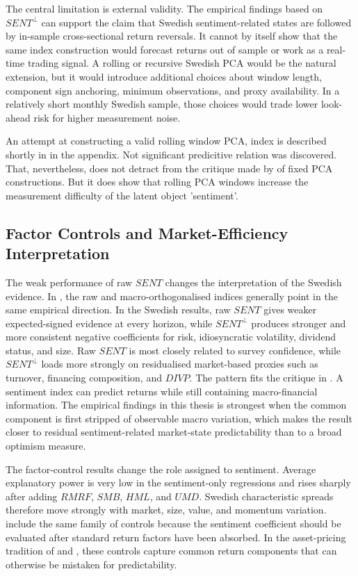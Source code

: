 \documentclass[11pt]{article}
\newcommand{\var}[1]{\ensuremath{#1}}
\begin{document}
The central limitation is external validity. The empirical findings based on \var{SENT^{\perp}} can support the claim that Swedish sentiment-related states are followed by in-sample cross-sectional return reversals. It cannot by itself show that the same index construction would forecast returns out of sample or work as a real-time trading signal. A rolling or recursive Swedish PCA would be the natural extension, but it would introduce additional choices about window length, component sign anchoring, minimum observations, and proxy availability. In a relatively short monthly Swedish sample, those choices would trade lower look-ahead risk for higher measurement noise. 

An attempt at constructing a valid rolling window PCA, index is described shortly in  in the appendix. Not significant predicitive relation was discovered. That, nevertheless, does not detract from the critique made by \citet{ung2024enhanced} of fixed PCA constructions. But it does show that rolling PCA windows increase the measurement difficulty of the latent object 'sentiment'.

\subsection{Factor Controls and Market-Efficiency Interpretation}
The weak performance of raw \var{SENT} changes the interpretation of the Swedish evidence. In \citet{baker2006sentiment}, the raw and macro-orthogonalised indices generally point in the same empirical direction. In the Swedish results, raw \var{SENT} gives weaker expected-signed evidence at every horizon, while \var{SENT^{\perp}} produces stronger and more consistent negative coefficients for risk, idiosyncratic volatility, dividend status, and size. Raw \var{SENT} is most closely related to survey confidence, while \var{SENT^{\perp}} loads more strongly on residualised market-based proxies such as turnover, financing composition, and \var{DIVP}. The pattern fits the critique in \citet{sibley2012sentimental}. A sentiment index can predict returns while still containing macro-financial information. The empirical findings in this thesis is strongest when the common component is first stripped of observable macro variation, which makes the result closer to residual sentiment-related market-state predictability than to a broad optimism measure.

The factor-control results change the role assigned to sentiment. Average explanatory power is very low in the sentiment-only regressions and rises sharply after adding \var{RMRF}, \var{SMB}, \var{HML}, and \var{UMD}. Swedish characteristic spreads therefore move strongly with market, size, value, and momentum variation. \citet{baker2006sentiment} include the same family of controls because the sentiment coefficient should be evaluated after standard return factors have been absorbed. In the asset-pricing tradition of \citet{fama1993common} and \citet{carhart1997persistence}, these controls capture common return components that can otherwise be mistaken for predictability.
\end{document}
